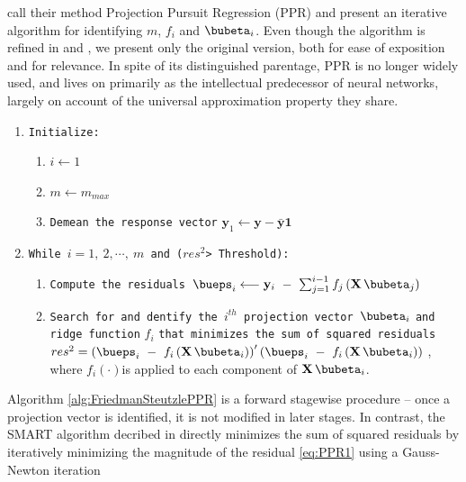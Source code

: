 \documentclass[graybox,envcountchap,sectrefs]{svmono}\usepackage[]{graphicx}\usepackage[]{xcolor}
\begin{document}
\begin{appendices}
\citet{FriedmanStuetzle1981} call their method Projection Pursuit
Regression (PPR) and present an iterative algorithm for identifying
$m$, $f_{i}$ and $\bubeta_{i}$. Even though the algorithm is refined
in \citet{Friedman1985} and \citet{Friedman1987}, we present only
the original version, both for ease of exposition and for relevance.
In spite of its distinguished parentage, PPR is no longer widely used,
and lives on primarily as the intellectual predecessor of neural networks,
largely on account of the universal approximation property they share.

\begin{algorithm}[H]
\begin{enumerate}
\item \texttt{Initialize:}
\begin{enumerate}
\item $i\longleftarrow1$
\item $m\longleftarrow m_{max}$
\item \texttt{Demean the response vector} $\mathbf{y}_{1}\longleftarrow\mathbf{y}-\bar{\mathbf{y}}\mathbf{1}$\medskip{}
\end{enumerate}
\item \texttt{While $i=1,\ 2,\cdots,\ m$ and ($res^{2}$> Threshold):}
\begin{enumerate}
\item \texttt{Compute the residuals $\mathrm{\bueps}_{i}\longleftarrow\mathbf{y}_{i}\ -\ \sum_{j=1}^{i-1}f_{j}\left(\mathbf{X}\,\bubeta_{j}\right)$}
\item \texttt{Search for and dentify the $i^{th}$ projection vector }$\bubeta_{i}$
\texttt{and ridge function} $f_{i}$ \texttt{that minimizes the sum
of squared residuals} $res^{2}=\left(\mathrm{\bueps}_{i}\ -\ f_{i}\left(\mathbf{X}\,\bubeta_{i}\right)\right)^{\prime}\left(\mathrm{\bueps}_{i}\ -\ f_{i}\left(\mathbf{X}\,\bubeta_{i}\right)\right)$
, where $f_{i}\left(\cdot\right)$is applied to each component of
$\mathbf{X}\,\bubeta_{i}$.\bigskip{}
\end{enumerate}
\end{enumerate}
\caption{\label{alg:FriedmanSteutzlePPR}The Friedman-Steutzle algorithm for
Projection Pursuit Regression}
\end{algorithm}

Algorithm \ref{alg:FriedmanSteutzlePPR} is a forward stagewise procedure
-- once a projection vector is identified, it is not modified in
later stages. In contrast, the SMART algorithm decribed in \citet{Friedman1985}
directly minimizes the sum of squared residuals by iteratively minimizing
the magnitude of the residual \eqref{eq:PPR1} using a Gauss-Newton
iteration


\end{appendices}
\end{document}
